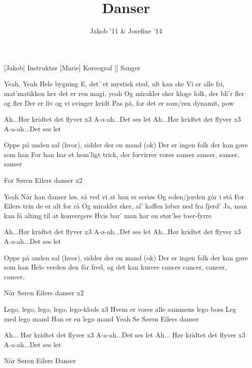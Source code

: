 \documentclass[a4paper,11pt]{article}
\title{Danser}
\author{Jakob '11 \& Josefine '14}
\begin{document}
\maketitle

\begin{roles}
[Jakob] Instruktør
[Marie] Koreograf
[] Sanger
\end{roles}

\begin{props}
\end{props}

\begin{song}
 Yeah, Yeah
Hele bygning E, 
det' et mystisk sted, alt kan ske
Vi er alle fri, 
mat'matikken her det er ren magi, yeah
Og mirakler sker
kloge folk, der bli'r fler og fler
Der er liv og vi svinger kridt
Pas på, for det er som/ren dynamit, pow

 Ah...Hør kridtet det flyver x3 
A-a-ah...Det ses let
Ah...Hør kridtet det flyver x3
A-a-ah...Det ses let

 Oppe på anden sal (hvor), sidder der en mand (ok)
Der er ingen folk der kan gøre som han
For han har et hem'ligt trick, der forvirrer vores sanser
sanser, sanser, sanser

 For Søren Eilers danser x2

 Yeah
Når han danser løs,
så ved vi at han er seriøs
Og solen/jorden går i stå
For Eilers trin de er alt for rå
Og mirakler sker,
al' kaffen løber ned fra fjerd'
Ja, man kan få alting til at konvergere
Hvis bar' man har en stør'lse toer-fyrre

 Ah...Hør kridtet det flyver x3
A-a-ah...Det ses let
Ah...Hør kridtet det flyver x3
A-a-ah...Det ses let

 Oppe på anden sal (hvor), sidder der en mand (ok)
Der er ingen folk der kan gøre som han
Hele verden den får fred, og det kan kurere cancer
cancer, cancer, cancer,

 Når Søren Eilers danser x2


 Lego, lego, lego, lego, lego-klods x3
Hvem er vores alle sammens lego boss
Leg med lego mand
Han er en lego mand
Yeah
Se Søren Eilers danser

 Ah... Hør kridtet det flyver x3
A-a-ah...Det ses let
Ah...  Hør kridtet det flyver x3
A-a-ah...Det ses let %

 Når Søren Eilers Danser

\end{song}
\end{document}
